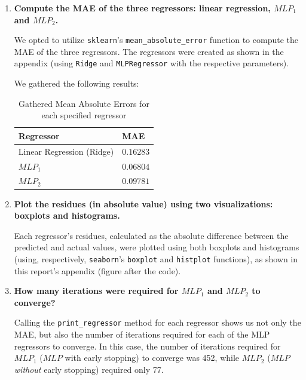 \documentclass[12pt]{article}
\begin{document}
\begin{enumerate}[leftmargin=\labelsep,resume]
  \item \textbf{Compute the MAE of the three regressors: linear regression, $MLP_1$ and $MLP_2$.}

        We opted to utilize \texttt{sklearn}'s \texttt{mean\_absolute\_error} function to compute the MAE of the three regressors.
        The regressors were created as shown in the appendix (using \texttt{Ridge} and
        \texttt{MLPRegressor} with the respective parameters).

        We gathered the following results:

        \begin{table}[h]
          \centering
          \begin{tabular}{l|l}
            Regressor                 & MAE       \\ \hline
            Linear Regression (Ridge) & $0.16283$ \\
            $MLP_1$                   & $0.06804$ \\
            $MLP_2$                   & $0.09781$
          \end{tabular}
          \caption{Gathered Mean Absolute Errors for each specified regressor}
          \label{tab:mean-absolute-errors}
        \end{table}

  \item \textbf{Plot the residues (in absolute value) using two visualizations: boxplots and histograms.}

        Each regressor's residues, calculated as the absolute difference between
        the predicted and actual values, were plotted using both boxplots and histograms
        (using, respectively, \texttt{seaborn}'s \texttt{boxplot} and \texttt{histplot} functions),
        as shown in this report's appendix (figure after the code).

  \item \textbf{How many iterations were required for $MLP_1$ and $MLP_2$ to converge?}

        Calling the \texttt{print\_regressor} method for each regressor shows us
        not only the MAE, but also the number of iterations required for each of
        the MLP regressors to converge. In this case, the number of iterations
        required for $MLP_1$ ($MLP$ with early stopping) to converge was 452,
        while $MLP_2$ ($MLP$ \textit{without} early stopping) required only 77.


\end{enumerate}
\end{document}
